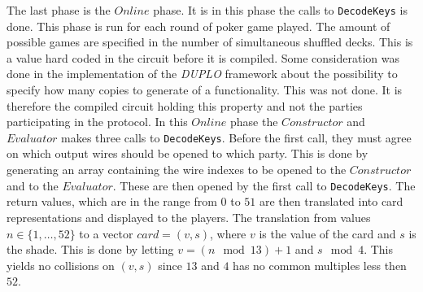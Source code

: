 \documentclass[twoside,11pt,openright]{report}
\newcommand{\DUPLO}{\textit{DUPLO} }
\begin{document}
The last phase is the $Online$ phase. It is in this phase the calls to \verb|DecodeKeys| is done. This phase is run for each round of poker game played. The amount of possible games are specified in the number of simultaneous shuffled decks. This is a value hard coded in the circuit before it is compiled. Some consideration was done in the implementation of the \DUPLO framework about the possibility to specify how many copies to generate of a functionality. This was not done. It is therefore the compiled circuit holding this property and not the parties participating in the protocol. In this $Online$ phase the $Constructor$ and $Evaluator$ makes three calls to \verb|DecodeKeys|. Before the first call, they must agree on which output wires should be opened to which party. This is done by generating an array containing the wire indexes to be opened to the $Constructor$ and to the $Evaluator$. These are then opened by the first call to \verb|DecodeKeys|. The return values, which are in the range from $0$ to $51$ are then translated into card representations and displayed to the players. The translation from values $n\in \{1,\dots,52\}$ to a vector $card=(v,s)$, where $v$ is the value of the card and $s$ is the shade. This is done by letting $v=(n \mod 13)+1$ and $s \mod 4$. This yields no collisions on $(v,s)$ since $13$ and $4$ has no common multiples less then $52$.
\end{document}
